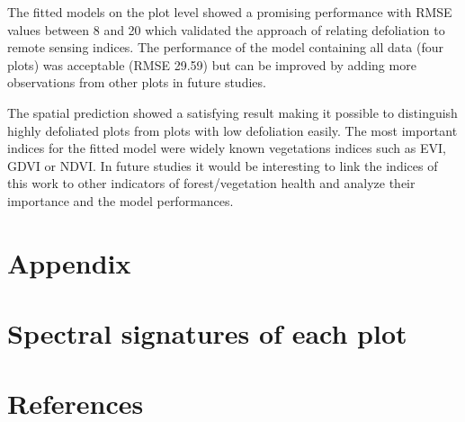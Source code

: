 \documentclass[review]{elsarticle}
\begin{document}
The fitted models on the plot level showed a promising performance with RMSE values between 8 and 20 which validated the approach of relating defoliation to remote sensing indices.
The performance of the model containing all data (four plots) was acceptable (RMSE 29.59) but can be improved by adding more observations from other plots in future studies.

The spatial prediction showed a satisfying result making it possible to distinguish highly defoliated plots from plots with low defoliation easily.
The most important indices for the fitted model were widely known vegetations indices such as EVI, GDVI or NDVI.
In future studies it would be interesting to link the indices of this work to other indicators of forest/vegetation health and analyze their importance and the model performances.



\section{Appendix}

\appendix
\gdef\thesection{\Alph{section}} %
\makeatletter
\renewcommand\@seccntformat[1]{Appendix \csname the#1\endcsname.\hspace{0.5em}}
\makeatother

\section{Spectral signatures of each plot}


\pagebreak


\section*{References}


\end{document}
